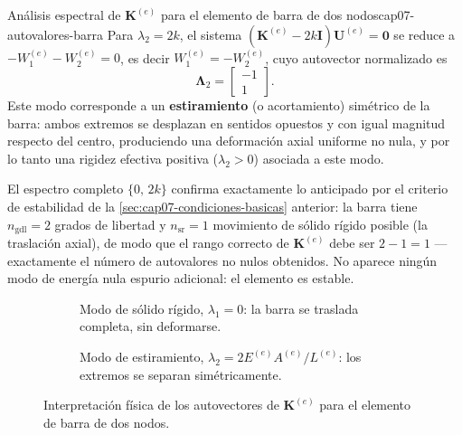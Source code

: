\begin{ejemplo}{Análisis espectral de $\bm K^{(e)}$ para el elemento de barra de dos nodos}{cap07-autovalores-barra}
Para $\lambda_2=2k$, el sistema $(\bm K^{(e)}-2k\bm I)\bm U^{(e)}=\bm 0$ se reduce a $-W_1^{(e)}-W_2^{(e)}=0$, es decir $W_1^{(e)}=-W_2^{(e)}$, cuyo autovector normalizado es
\[
\bm\Lambda_2 = \begin{bmatrix}-1\\1\end{bmatrix} .
\]
Este modo corresponde a un \textbf{estiramiento} (o acortamiento) simétrico de la barra: ambos extremos se desplazan en sentidos opuestos y con igual magnitud respecto del centro, produciendo una deformación axial uniforme no nula, y por lo tanto una rigidez efectiva positiva ($\lambda_2>0$) asociada a este modo.

El espectro completo $\{0,\,2k\}$ confirma exactamente lo anticipado por el criterio de estabilidad de la \cref{sec:cap07-condiciones-basicas} anterior: la barra tiene $n_{\text{gdl}}=2$ grados de libertad y $n_{\text{sr}}=1$ movimiento de sólido rígido posible (la traslación axial), de modo que el rango correcto de $\bm K^{(e)}$ debe ser $2-1=1$ --- exactamente el número de autovalores no nulos obtenidos. No aparece ningún modo de energía nula espurio adicional: el elemento es estable.
\end{ejemplo}

\begin{figure}[htbp]
\centering
\begin{subfigure}[b]{0.47\textwidth}
\centering
{}
\caption{Modo de sólido rígido, $\lambda_1=0$: la barra se traslada completa, sin deformarse.}
\label{fig:cap07-modo-cuerpo-rigido}
\end{subfigure}
\hfill
\begin{subfigure}[b]{0.47\textwidth}
\centering
{}
\caption{Modo de estiramiento, $\lambda_2=2E^{(e)}A^{(e)}/L^{(e)}$: los extremos se separan simétricamente.}
\label{fig:cap07-modo-estiramiento}
\end{subfigure}
\caption{Interpretación física de los autovectores de $\bm K^{(e)}$ para el elemento de barra de dos nodos.}
\label{fig:cap07-modos-barra}
\end{figure}

